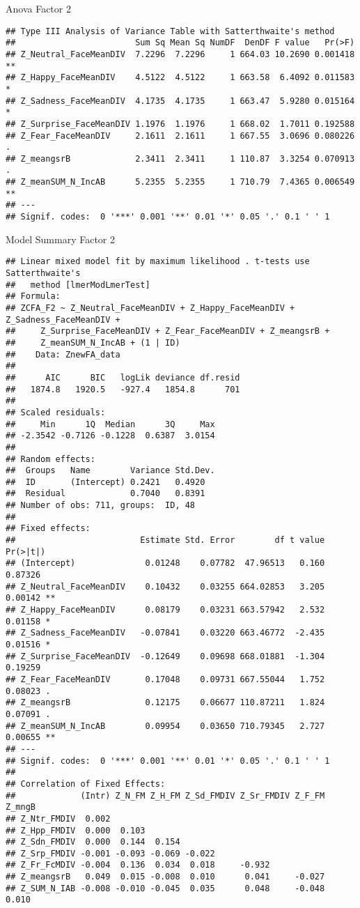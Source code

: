 \documentclass[
]{article}
\begin{document}
Anova Factor 2

\begin{verbatim}
## Type III Analysis of Variance Table with Satterthwaite's method
##                        Sum Sq Mean Sq NumDF  DenDF F value   Pr(>F)   
## Z_Neutral_FaceMeanDIV  7.2296  7.2296     1 664.03 10.2690 0.001418 **
## Z_Happy_FaceMeanDIV    4.5122  4.5122     1 663.58  6.4092 0.011583 * 
## Z_Sadness_FaceMeanDIV  4.1735  4.1735     1 663.47  5.9280 0.015164 * 
## Z_Surprise_FaceMeanDIV 1.1976  1.1976     1 668.02  1.7011 0.192588   
## Z_Fear_FaceMeanDIV     2.1611  2.1611     1 667.55  3.0696 0.080226 . 
## Z_meangsrB             2.3411  2.3411     1 110.87  3.3254 0.070913 . 
## Z_meanSUM_N_IncAB      5.2355  5.2355     1 710.79  7.4365 0.006549 **
## ---
## Signif. codes:  0 '***' 0.001 '**' 0.01 '*' 0.05 '.' 0.1 ' ' 1
\end{verbatim}

Model Summary Factor 2

\begin{verbatim}
## Linear mixed model fit by maximum likelihood . t-tests use Satterthwaite's
##   method [lmerModLmerTest]
## Formula: 
## ZCFA_F2 ~ Z_Neutral_FaceMeanDIV + Z_Happy_FaceMeanDIV + Z_Sadness_FaceMeanDIV +  
##     Z_Surprise_FaceMeanDIV + Z_Fear_FaceMeanDIV + Z_meangsrB +  
##     Z_meanSUM_N_IncAB + (1 | ID)
##    Data: ZnewFA_data
## 
##      AIC      BIC   logLik deviance df.resid 
##   1874.8   1920.5   -927.4   1854.8      701 
## 
## Scaled residuals: 
##     Min      1Q  Median      3Q     Max 
## -2.3542 -0.7126 -0.1228  0.6387  3.0154 
## 
## Random effects:
##  Groups   Name        Variance Std.Dev.
##  ID       (Intercept) 0.2421   0.4920  
##  Residual             0.7040   0.8391  
## Number of obs: 711, groups:  ID, 48
## 
## Fixed effects:
##                         Estimate Std. Error        df t value Pr(>|t|)   
## (Intercept)              0.01248    0.07782  47.96513   0.160  0.87326   
## Z_Neutral_FaceMeanDIV    0.10432    0.03255 664.02853   3.205  0.00142 **
## Z_Happy_FaceMeanDIV      0.08179    0.03231 663.57942   2.532  0.01158 * 
## Z_Sadness_FaceMeanDIV   -0.07841    0.03220 663.46772  -2.435  0.01516 * 
## Z_Surprise_FaceMeanDIV  -0.12649    0.09698 668.01881  -1.304  0.19259   
## Z_Fear_FaceMeanDIV       0.17048    0.09731 667.55044   1.752  0.08023 . 
## Z_meangsrB               0.12175    0.06677 110.87211   1.824  0.07091 . 
## Z_meanSUM_N_IncAB        0.09954    0.03650 710.79345   2.727  0.00655 **
## ---
## Signif. codes:  0 '***' 0.001 '**' 0.01 '*' 0.05 '.' 0.1 ' ' 1
## 
## Correlation of Fixed Effects:
##             (Intr) Z_N_FM Z_H_FM Z_Sd_FMDIV Z_Sr_FMDIV Z_F_FM Z_mngB
## Z_Ntr_FMDIV  0.002                                                  
## Z_Hpp_FMDIV  0.000  0.103                                           
## Z_Sdn_FMDIV  0.000  0.144  0.154                                    
## Z_Srp_FMDIV -0.001 -0.093 -0.069 -0.022                             
## Z_Fr_FcMDIV -0.004  0.136  0.034  0.018     -0.932                  
## Z_meangsrB   0.049  0.015 -0.008  0.010      0.041     -0.027       
## Z_SUM_N_IAB -0.008 -0.010 -0.045  0.035      0.048     -0.048  0.010
\end{verbatim}
\end{document}
